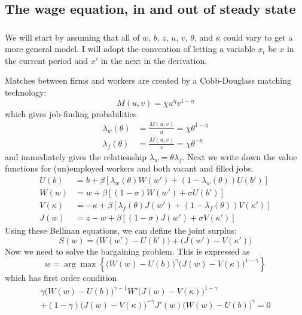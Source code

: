 \documentclass[12pt, letterpaper, parskip = full]{article}
\begin{document}
	\subsection{The wage equation, in and out of steady state}

	\subsubsection{}

	We will start by assuming that all of \(w\), \(b\), \(z\), \(u\), \(v\), \(\theta\), and \(\kappa\) could vary to get a more general model. I will adopt the convention of letting a variable \(x_t\) be \(x\) in the current period and \(x'\) in the next in the derivation.
	
	Matches between firms and workers are created by a Cobb-Douglass matching technology:
	\[ M(u,v) = \chi u^\eta v^{1-\eta}    \]
	which gives job-finding probabilities
	\begin{align*}
	\lambda_w(\theta) &= \frac{M(u,v)}{u} = \chi \theta^{1-\eta} \\
	\lambda_f(\theta) &= \frac{M(u,v)}{v} = \chi \theta^{-\eta}
	\end{align*}
	and immediately gives the relationship \(\lambda_w = \theta \lambda_f\). Next we  write down the value functions for (un)employed workers and both vacant and filled jobs.
	\begin{align*}
	U(b) &= b + \beta \left[\lambda_w(\theta) W(w') + (1 - \lambda_w(\theta)) U(b')\right]\\
	W(w) &= w + \beta \left[(1 - \sigma) W(w') + \sigma U(b')\right]\\
	V(\kappa) &= - \kappa + \beta \left[\lambda_f(\theta) J(w') + (1 - \lambda_f(\theta)) V(\kappa')\right]\\
	J(w) &= z - w + \beta \left[(1-\sigma) J(w') + \sigma V(\kappa')\right]
	\end{align*}
	Using these Bellman equations, we can define the joint surplus:
	\[ S(w) = \Big(W(w') - U(b')\Big) + \Big(J(w') - V(\kappa')\Big)     \]
	Now we need to solve the bargaining problem. This is expressed as
	\[ w = \arg \max \left\{\Big(W(w)-U(b)\Big)^\gamma \Big(J(w) - V(\kappa)\Big)^{1-\gamma}\right\}  \]
	which has first order condition
	\begin{multline*}
	\gamma \Big(W(w) - U(b)\Big)^{\gamma - 1}W' \Big(J(w) - V(\kappa)\Big)^{1-\gamma} \\+ (1 - \gamma) \Big(J(w) - V(\kappa)\Big)^{-\gamma} J'(w) \Big(W(w) - U(b)\Big)^{\gamma} = 0
	\end{multline*}
\end{document}
